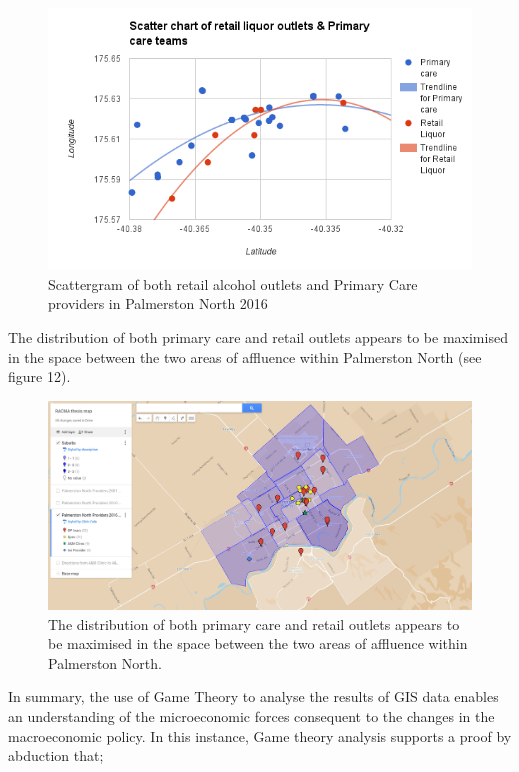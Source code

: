 \documentclass[11pt,a4paper]{article}
\begin{document}
\begin{figure}[htp]
\centering
\includegraphics[scale=0.6]{Nash_GP_retail.png}
\caption{ Scattergram of both retail alcohol outlets and Primary Care providers in Palmerston North 2016}
\label{Geographic distribution of practices by 2016, with retail outlets overlaid}
\end{figure}

The distribution of both primary care and retail outlets appears to be maximised in the space between the two areas of affluence within Palmerston North (see figure 12).\\

\begin{figure}[htp]
\centering
\includegraphics[scale=0.40]{fig12.png}
\caption{The distribution of both primary care and retail outlets appears to be maximised in the space between the two areas of affluence within Palmerston North.}
\label{Distribution of General Practitioners overlaid on suburb's social deprivation}
\end{figure}

In summary, the use of Game Theory to analyse the results of GIS data enables an understanding of the microeconomic forces consequent to the changes in the macroeconomic policy. In this instance, Game theory analysis supports a proof by abduction that;
\end{document}
